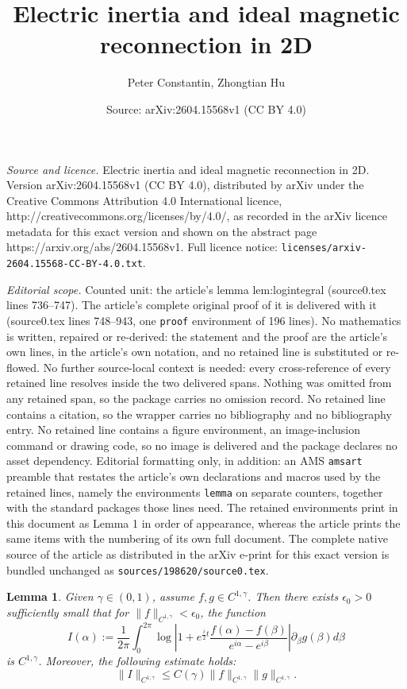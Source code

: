 \documentclass[10pt,a4paper]{amsart}
\title{Electric inertia and ideal magnetic reconnection in 2D}
\author{Peter Constantin, Zhongtian Hu}
\date{Source: arXiv:2604.15568v1 (CC BY 4.0)}
\newtheorem{lemma}{Lemma}
\newcommand{\eps}{\epsilon}
\newcommand{\p}{\partial}
\newcommand{\pb}{\p_\beta}
\begin{document}
\maketitle

\noindent\emph{Source and licence.} Electric inertia and ideal magnetic reconnection in 2D. Version arXiv:2604.15568v1 (CC BY 4.0), distributed by arXiv under the Creative Commons Attribution 4.0 International licence, http://creativecommons.org/licenses/by/4.0/, as recorded in the arXiv licence metadata for this exact version and shown on the abstract page https://arxiv.org/abs/2604.15568v1. Full licence notice: \texttt{licenses/arxiv-2604.15568-CC-BY-4.0.txt}.\par\smallskip

\noindent\textit{Editorial scope.} Counted unit: the article's lemma lem:logintegral (source0.tex lines 736--747). The article's complete original proof of it is delivered with it (source0.tex lines 748--943, one \texttt{proof} environment of 196 lines). No mathematics is written, repaired or re-derived: the statement and the proof are the article's own lines, in the article's own notation, and no retained line is substituted or re-flowed.  No further source-local context is needed: every cross-reference of every retained line resolves inside the two delivered spans.  Nothing was omitted from any retained span, so the package carries no omission record.  No retained line contains a citation, so the wrapper carries no bibliography and no bibliography entry.  No retained line contains a figure environment, an image-inclusion command or drawing code, so no image is delivered and the package declares no asset dependency.  Editorial formatting only, in addition: an AMS \texttt{amsart} preamble that restates the article's own declarations and macros used by the retained lines, namely the environments \texttt{lemma} on separate counters, together with the standard packages those lines need.  The retained environments print in this document as Lemma 1 in order of appearance, whereas the article prints the same items with the numbering of its own full document.  The complete native source of the article as distributed in the arXiv e-print for this exact version is bundled unchanged as \texttt{sources/198620/source0.tex}.
\begin{lemma}\label{lem:logintegral}
    Given $\gamma \in (0,1)$, assume $f, g \in C^{1,\gamma}$. Then there exists $\eps_0 > 0$ sufficiently small that for $\|f\|_{C^{1,\gamma}} < \eps_0$, the function
    \begin{equation}
        \label{eq:logintegral}
        I(\alpha) := \frac{1}{2\pi}\int_0^{2\pi} \log \left|1 + e^{\frac{i}{2}t}\frac{f(\alpha) - f(\beta)}{e^{i\alpha} - e^{i\beta}}\right| \pb g(\beta) d\beta
    \end{equation}
    is $C^{1,\gamma}$. Moreover, the following estimate holds:
    \begin{equation}
        \label{est:logintegral}
        \|I\|_{C^{1,\gamma}} \le C(\gamma)\|f\|_{C^{1,\gamma}}\|g\|_{C^{1,\gamma}}.
    \end{equation}
\end{lemma}
\end{document}
